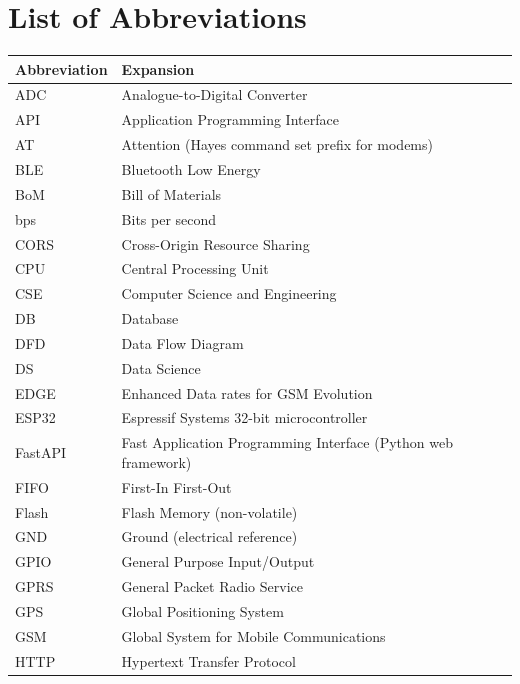 

\chapter*{List of Abbreviations}

\begin{longtable}{p{3.2cm} p{10cm}}
\toprule
\textbf{Abbreviation} & \textbf{Expansion} \\
\midrule
\endhead
ADC   & Analogue-to-Digital Converter \\
API   & Application Programming Interface \\
AT    & Attention (Hayes command set prefix for modems) \\
BLE   & Bluetooth Low Energy \\
BoM   & Bill of Materials \\
bps   & Bits per second \\
CORS  & Cross-Origin Resource Sharing \\
CPU   & Central Processing Unit \\
CSE   & Computer Science and Engineering \\
DB    & Database \\
DFD   & Data Flow Diagram \\
DS    & Data Science \\
EDGE  & Enhanced Data rates for GSM Evolution \\
ESP32 & Espressif Systems 32-bit microcontroller \\
FastAPI & Fast Application Programming Interface (Python web framework) \\
FIFO  & First-In First-Out \\
Flash & Flash Memory (non-volatile) \\
GND   & Ground (electrical reference) \\
GPIO  & General Purpose Input/Output \\
GPRS  & General Packet Radio Service \\
GPS   & Global Positioning System \\
GSM   & Global System for Mobile Communications \\
HTTP  & Hypertext Transfer Protocol \\

\end{longtable}
